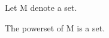 \begin{forthel}

Let M denote a set.

\begin{lemma}
The powerset of M is a set.
\end{lemma}

\end{forthel}